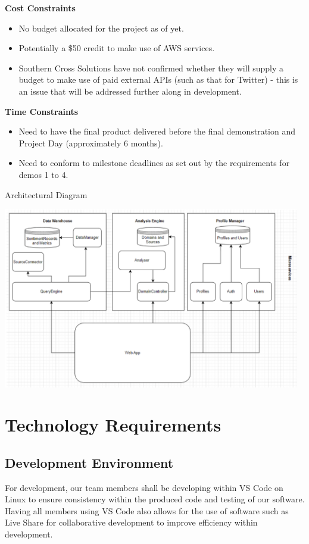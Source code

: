 \documentclass[12pt]{article}
\begin{document}
\textbf{Cost Constraints}
\begin{itemize}
  \item No budget allocated for the project as of yet.
  \item Potentially a \$50 credit to make use of AWS services.
  \item Southern Cross Solutions have not confirmed whether they will supply a budget to make use of paid external APIs (such as that for Twitter) - this is an issue that will be addressed further along in development.
\end{itemize}

\textbf{Time Constraints}
\begin{itemize}
  \item Need to have the final product delivered before the final demonstration and Project Day (approximately 6 months).
  \item Need to conform to milestone deadlines as set out by the requirements for demos 1 to 4.
\end{itemize}

Architectural Diagram

\begin{center}
  \includegraphics[width=13cm]{../../Images/archDiagram.png}

\end{center}

\newpage

\section{Technology Requirements}

\subsection{Development Environment}
For development, our team members shall be developing within VS Code on Linux to ensure consistency within the produced code and testing of our software. Having all members using VS Code also allows for the use of software such as Live Share for collaborative development to improve efficiency within development.
\end{document}
